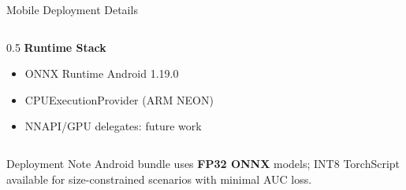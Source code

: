 \documentclass[aspectratio=169,12pt]{beamer}
\newcommand{\highlight}[1]{\textcolor{primaryblue}{\textbf{#1}}}
\begin{document}
\begin{frame}{Mobile Deployment Details}
\begin{columns}[T]
\begin{column}{0.5\textwidth}
\vspace{0.3em}
\textbf{Runtime Stack}
\begin{itemize}
\setlength\itemsep{0.1em}
    \item ONNX Runtime Android 1.19.0
    \item CPUExecutionProvider (ARM NEON)
    \item NNAPI/GPU delegates: future work
\end{itemize}
\end{column}
\end{columns}

\vspace{0.3em}
\begin{block}{Deployment Note}
Android bundle uses \highlight{FP32 ONNX} models; INT8 TorchScript available for size-constrained scenarios with minimal AUC loss.
\end{block}
\end{frame}
\end{document}
